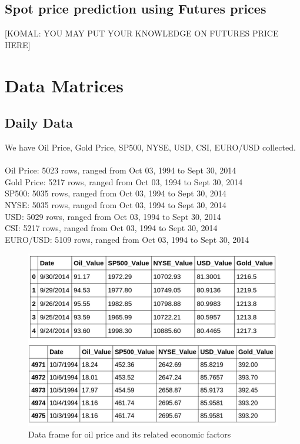 \documentclass[runningheads]{llncs}
\begin{document}
\subsection{Spot price prediction using Futures prices}
[KOMAL: YOU MAY PUT YOUR KNOWLEDGE ON FUTURES PRICE HERE]

\section{Data Matrices}

\subsection{Daily Data} We have Oil Price, Gold Price, SP500, NYSE, USD, CSI, EURO/USD collected. \\\\

\noindent Oil Price: 5023 rows, ranged from Oct 03, 1994 to Sept 30, 2014 \\
Gold Price: 5217 rows, ranged from Oct 03, 1994 to Sept 30, 2014 \\
SP500: 5035 rows, ranged from Oct 03, 1994 to Sept 30, 2014 \\
NYSE: 5035 rows, ranged from Oct 03, 1994 to Sept 30, 2014 \\
USD: 5029 rows, ranged from Oct 03, 1994 to Sept 30, 2014 \\
CSI: 5217 rows, ranged from Oct 03, 1994 to Sept 30, 2014 \\
EURO/USD: 5109 rows, ranged from Oct 03, 1994 to Sept 30, 2014 \\

\begin{figure}
\centering
\includegraphics[width=\textwidth]{DataMatrices_Oil_Daily.png}
\caption{Data frame for oil price and its related economic factors}
\label{fig:DataMatrices_Oil_Daily.png}
\end{figure}
\end{document}
